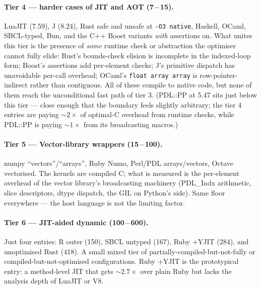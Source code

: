 \documentclass[11pt,a4paper]{article}
\begin{document}
\paragraph{Tier 4 --- harder cases of JIT and AOT (7\,--\,15).}
LuaJIT (7.59), J (8.24), Rust safe and unsafe at \verb|-O3 native|,
Haskell, OCaml, SBCL-typed, Bun, and the C++ Boost variants
\emph{with} assertions on. What unites this tier is the presence of
\emph{some} runtime check or abstraction the optimiser cannot fully
elide: Rust's bounds-check elision is incomplete in the indexed-loop
form; Boost's assertions add per-element checks; J's primitive
dispatch has unavoidable per-call overhead; OCaml's
\texttt{float array array} is row-pointer-indirect rather than
contiguous. All of these compile to native code, but none of them
reach the unconditional fast path of tier 3. (PDL::PP at 5.47 sits
just below this tier --- close enough that the boundary feels
slightly arbitrary; the tier 4 entries are paying $\sim\!2\!\times$
of optimal-C overhead from runtime checks, while PDL::PP is paying
$\sim\!1\!\times$ from its broadcasting macros.)

\paragraph{Tier 5 --- Vector-library wrappers (15\,--\,100).}
numpy ``vectors''/``arrays'', Ruby Numo, Perl/PDL arrays/vectors,
Octave vectorised. The kernels are compiled C; what is measured is
the per-element overhead of the vector library's broadcasting
machinery (PDL\_Indx arithmetic, slice descriptors, dtype dispatch,
the GIL on Python's side). Same floor everywhere --- the host
language is not the limiting factor.

\paragraph{Tier 6 --- JIT-aided dynamic (100\,--\,600).}
Just four entries: R outer (150), SBCL untyped (167), Ruby +YJIT
(284), and unoptimised Rust (418). A small mixed tier of
partially-compiled-but-not-fully or compiled-but-not-optimised
configurations. Ruby +YJIT is the prototypical entry: a method-level
JIT that gets ${\sim}\!2.7\!\times$ over plain Ruby but lacks the
analysis depth of LuaJIT or V8.
\end{document}
